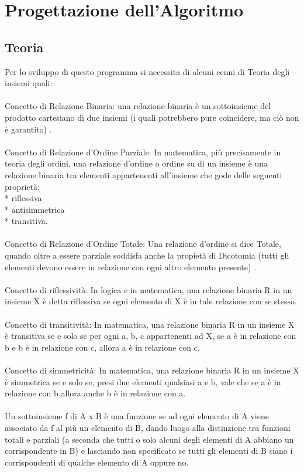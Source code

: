 \documentclass[11pt, a4paper, titlepage, block]{article}
\begin{document}
	
	
	\newpage                        
\section{Progettazione dell'Algoritmo}
\subsection{Teoria}
Per lo sviluppo di questo programma si necessita di alcuni cenni di Teoria degli insiemi quali:\\
\\
Concetto di Relazione Binaria:  una relazione binaria \`e un sottoinsieme del prodotto
cartesiano di due insiemi  (i quali potrebbero pure coincidere,
ma ci\`o non \`e garantito) .\\
\\
Concetto di Relazione d'Ordine Parziale: In matematica, pi\`u precisamente in teoria degli ordini, una relazione d'ordine o ordine su di un insieme \`e una relazione binaria tra elementi appartenenti all'insieme che gode delle seguenti propriet\`a:\\
* riflessiva\\
* antisimmetrica\\
* transitiva.\\
\\
Concetto di Relazione d'Ordine Totale: Una relazione d'ordine si dice Totale, quando oltre a essere parziale soddisfa anche la propiet\`a di Dicotomia  (tutti gli elementi devono essere in relazione con ogni altro elemento presente) .\\
\\
Concetto di riflessivit\`a:  In logica e in matematica, una relazione binaria R in un insieme X \`e detta riflessiva se ogni elemento di X \`e in tale relazione con se stesso. \\
\\
Concetto di transitivit\`a: In matematica, una relazione binaria R in un insieme X \`e transitiva se e solo se per ogni a, b, c appartenenti ad X, se a \`e in relazione con b e b \`e in relazione con c, allora a \`e in relazione con c. \\
\\
Concetto di simmetricit\`a: In matematica, una relazione binaria R in un insieme X \`e simmetrica se e solo se, presi due elementi qualsiasi a e b, vale che se a \`e in relazione con b allora anche b \`e in relazione con a.\\
\\
Un sottoinsieme f di A x B \`e una funzione se ad ogni
elemento di A viene associato da f al pi\`u un elemento di B,
dando luogo alla distinzione tra funzioni totali e parziali
 (a seconda che tutti o solo alcuni degli elementi di A
abbiano un corrispondente in B)  e lasciando non specificato
se tutti gli elementi di B siano i corrispondenti di
qualche elemento di A oppure no.\\
\newpage
\end{document}
